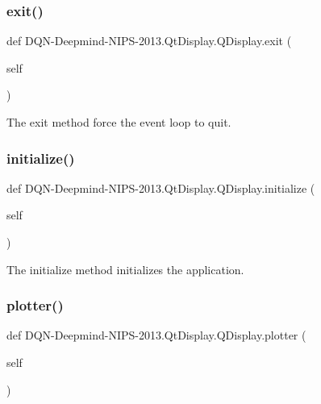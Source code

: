 \subsubsection{\texorpdfstring{exit()}{exit()}}
{\footnotesize\ttfamily def D\+QN-\/Deepmind-\/N\+I\+PS-\/2013.Qt\+Display.\+Q\+Display.\+exit (\begin{DoxyParamCaption}\item[{}]{self }\end{DoxyParamCaption})}



The exit method force the event loop to quit. 

\hypertarget{classDQN-Deepmind-NIPS-2013_1_1QtDisplay_1_1QDisplay_a12e947e8732fe3848a4746d4d3cf75c3}{}\label{classDQN-Deepmind-NIPS-2013_1_1QtDisplay_1_1QDisplay_a12e947e8732fe3848a4746d4d3cf75c3} 
\subsubsection{\texorpdfstring{initialize()}{initialize()}}
{\footnotesize\ttfamily def D\+QN-\/Deepmind-\/N\+I\+PS-\/2013.Qt\+Display.\+Q\+Display.\+initialize (\begin{DoxyParamCaption}\item[{}]{self }\end{DoxyParamCaption})}



The initialize method initializes the application. 

\hypertarget{classDQN-Deepmind-NIPS-2013_1_1QtDisplay_1_1QDisplay_aa399a47324e5e725fd5f5fd393e997ef}{}\label{classDQN-Deepmind-NIPS-2013_1_1QtDisplay_1_1QDisplay_aa399a47324e5e725fd5f5fd393e997ef} 
\subsubsection{\texorpdfstring{plotter()}{plotter()}}
{\footnotesize\ttfamily def D\+QN-\/Deepmind-\/N\+I\+PS-\/2013.Qt\+Display.\+Q\+Display.\+plotter (\begin{DoxyParamCaption}\item[{}]{self }\end{DoxyParamCaption})}



